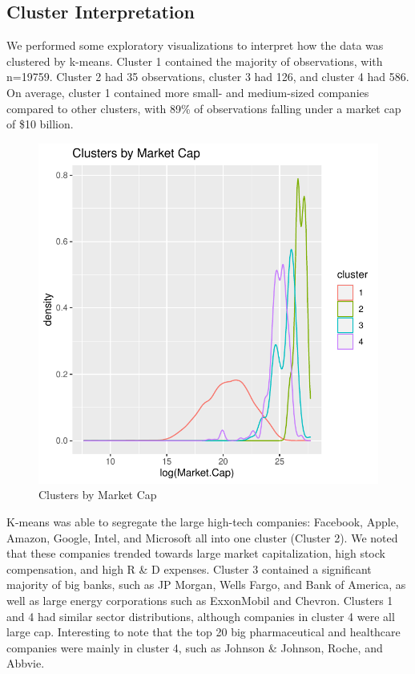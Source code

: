 \documentclass[11pt,]{article}
\begin{document}
\hypertarget{cluster-interpretation}{%
\subsection{Cluster Interpretation}\label{cluster-interpretation}}

We performed some exploratory visualizations to interpret how the data
was clustered by k-means. Cluster 1 contained the majority of
observations, with n=19759. Cluster 2 had 35 observations, cluster 3 had
126, and cluster 4 had 586. On average, cluster 1 contained more small-
and medium-sized companies compared to other clusters, with 89\% of
observations falling under a market cap of \$10 billion.\\

\begin{figure}

{\centering \includegraphics{stock_analysis_files/figure-latex/cluster by marketcap-1} 

}

\caption{Clusters by Market Cap}\label{fig:cluster by marketcap}
\end{figure}

K-means was able to segregate the large high-tech companies: Facebook,
Apple, Amazon, Google, Intel, and Microsoft all into one cluster
(Cluster 2). We noted that these companies trended towards large market
capitalization, high stock compensation, and high R \& D expenses.
Cluster 3 contained a significant majority of big banks, such as JP
Morgan, Wells Fargo, and Bank of America, as well as large energy
corporations such as ExxonMobil and Chevron. Clusters 1 and 4 had
similar sector distributions, although companies in cluster 4 were all
large cap. Interesting to note that the top 20 big pharmaceutical and
healthcare companies were mainly in cluster 4, such as Johnson \&
Johnson, Roche, and Abbvie.\\
\end{document}
